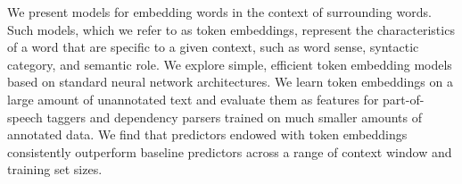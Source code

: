 We present models for embedding words in the context of surrounding words. Such models, which we refer to as token embeddings, represent the characteristics of a word that are specific to a given context, such as word sense, syntactic category, and semantic role. We explore simple, efficient token embedding models based on standard neural network architectures. We learn token embeddings on a large amount of unannotated text and evaluate them as features for part-of-speech taggers and dependency parsers trained on much smaller amounts of annotated data.  We find that predictors endowed with token embeddings consistently outperform baseline predictors across a range of context window and training set sizes.
